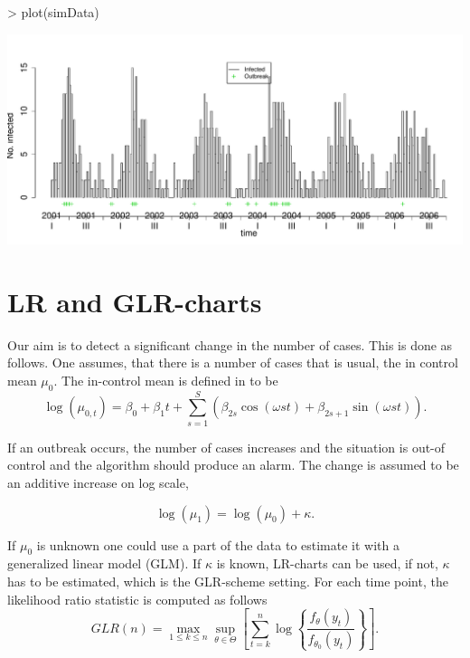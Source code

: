 \documentclass[a4paper,11pt]{article}
\begin{document}
\begin{Schunk}
\begin{Sinput}
> plot(simData)
\end{Sinput}
\end{Schunk}
\includegraphics{figs/vignette_glrnb-004}

\section{LR and GLR-charts}\label{sec:glr}


Our aim is to detect a significant change in the number of cases. This is done as follows. One assumes, that there is a number of cases that is usual, the in control mean $\mu_0$. The in-control mean is defined in \citet{hoehle2008} to be
\begin{equation} \label{mu0}
\operatorname{log}(\mu_{0,t})=\beta_0 + \beta_1t + \sum_{s=1}^S(\beta_{2s} \cos(\omega s t) + \beta_{2s+1}\sin(\omega s t)).
\end{equation}

If an outbreak occurs, the number of cases increases and the situation is out-of control and the algorithm should produce an alarm. The change is assumed to be an additive increase on log scale,

\begin{equation} \label{interceptchange}
\operatorname{log}(\mu_1)= \operatorname{log}(\mu_0) + \kappa .
\end{equation}

If $\mu_0$ is unknown one could use a part of the data to estimate it with a generalized linear model (GLM). If $\kappa$ is known, LR-charts can be used, if not, $\kappa$ has to be estimated, which is the GLR-scheme setting. For each time point, the likelihood ratio statistic is computed as follows
\begin{equation}
\label{cusum}
GLR(n)=\max_{1 \leq k \leq n} \sup_{\theta \in \Theta} \left[ \sum_{t=k}^n \log
\left\{ \frac{f_{\theta}(y_t)}{f_{\theta_0}(y_t)}
\right\} \right]
.  
\end{equation}
\end{document}
